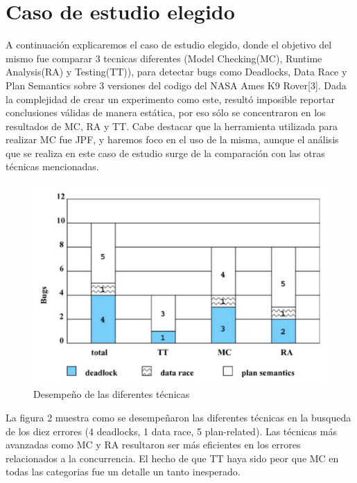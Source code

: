 \documentclass[runningheads]{llncs}
\begin{document}
\section{Caso de estudio elegido}
A continuaci\'on explicaremos el caso de estudio elegido, donde el objetivo del mismo fue comparar 3 tecnicas diferentes (Model Checking(MC), Runtime Analysis(RA) y Testing(TT)), para detectar bugs como Deadlocks, Data Race y Plan Semantics sobre 3 versiones del codigo del NASA Ames K9 Rover[3].
Dada la complejidad de crear un experimento como este, result\'o imposible reportar conclusiones v\'alidas de manera est\'atica, por eso s\'olo se concentraron en los resultados de MC, RA y TT. Cabe destacar que la herramienta utilizada para realizar MC fue JPF, y haremos foco en el uso de la misma, aunque el an\'alisis que se realiza en este caso de estudio surge de la comparaci\'on con las otras t\'ecnicas mencionadas.

\begin{figure}[H]
\centering
\includegraphics[scale=0.33]{fig2.png}
\caption{Desempe\~no de las diferentes t\'ecnicas} \label{fig2}
\end{figure}
La figura 2 muestra como se desempe\~naron las diferentes t\'ecnicas en la busqueda de los diez errores (4 deadlocks, 1 data race, 5 plan-related). Las t\'ecnicas m\'as avanzadas como MC y RA resultaron ser m\'as eficientes en los errores relacionados a la concurrencia. El hecho de que TT haya sido peor que MC en todas las categorias fue un detalle un tanto inesperado.\\
\end{document}
